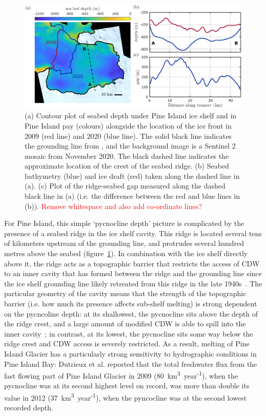 \documentclass[draft]{agujournal2019}
\newcommand{\red}[1]{\textcolor{red}{#1}}
\begin{document}
\begin{figure}
    \centering
    \includegraphics[width = \textwidth]{../make_figures/plots/figure1.eps}
    \caption{(a) Contour plot of seabed depth under Pine Island ice shelf and in Pine Island pay (colours) alongside the location of the ice front in 2009 (red line) and 2020 (blue line). The solid black line indicates the grounding line from \cite{Joughin2010GRL}, and the background image is a Sentinel 2 mosaic from November 2020. The black dashed line indicates the approximate location of the crest of the seabed ridge. (b) Seabed bathymetry (blue) and ice draft (red) taken along the dashed line in (a). (c) Plot of the ridge-seabed gap measured along the dashed black line in (a) (i.e. the difference between the red and blue lines in (b)). \red{Remove whitespace and also add co-ordinate lines?}}
    \label{fig:figure1}
\end{figure}


For Pine Island, this simple `pycnocline depth' picture is complicated by the presence of a seabed ridge in the ice shelf cavity. This ridge is located several tens of kilometers upstream of the grounding line, and protrudes several hundred metres above the seabed (figure~\ref{fig:figure1}). In combination with the ice shelf directly above it, the ridge acts as a topographic barrier that restricts the access of CDW to an inner cavity that has formed between the ridge and the grounding line since the ice shelf grounding line likely retreated from this ridge in the late 1940s~\cite{Jenkins2010NatureGeo, DeRydt2014JGeophysResOceans, DeRydt2016JGeophysResEarthSurf}. The particular geometry of the cavity means that the strength of the topographic barrier (i.e. how much its presence affects sub-shelf melting) is strong dependent on the pycncoline depth: at its shallowest, the pycnocline sits above the depth of the ridge crest, and a large amount of modified CDW is able to spill into the inner cavity~\cite{Dutrieux2014Science}; in contrast, at its lowest, the pycnocline sits some way below the ridge crest and CDW access is severely restricted.  As a result, melting of Pine Island Glacier has a particularly strong sensitivity to hydrographic conditions in Pine Island Bay: Dutrieux et al. reported that the total freshwater flux from the fast flowing part of Pine Island Glacier in 2009 (80~km\textsuperscript{3}~year\textsuperscript{-1}), when the pycnocline was at its second highest level on record, was more than double its value in 2012 (37~km\textsuperscript{3}~year\textsuperscript{-1}), when the pyncocline was at the second lowest recorded depth.
\end{document}
